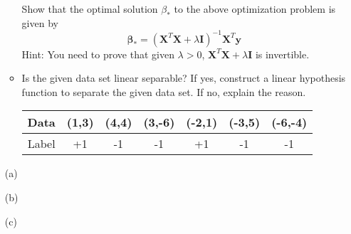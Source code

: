 \documentclass[10pt]{article}
\begin{document}
\begin{enumerate}[1.]
\begin{itemize}
			Show that the optimal solution $\beta_*$ to the above optimization problem is given by
			\[\mathbf{\beta}_* = (\mathbf{X}^T\mathbf{X} + \lambda \mathbf{I})^{-1}\mathbf{X}^T\mathbf{y}\]
			Hint: You need to prove that given $\lambda>0$, $\mathbf{X}^T\mathbf{X} + \lambda \mathbf{I}$ is invertible. 
			\item[(c)] Is the given data set linear separable? If yes, construct a linear hypothesis function to separate the given data set. If no, explain the reason. 
			
			\begin{table}[h]
				\centering
				\begin{tabular}{c|cccccc}
					Data & (1,3) & (4,4) & (3,-6) & (-2,1) & (-3,5) & (-6,-4) \\ \hline
					Label & +1 & -1 & -1 & +1 & -1 & -1
				\end{tabular}
				\label{tab:my_label}
			\end{table}
	      \end{itemize}
(a)




(b)




(c)
      	  
      	  
      	  \newpage


\end{enumerate}
\end{document}
